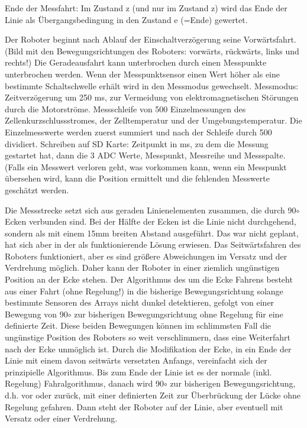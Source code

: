 \documentclass[a4paper,bibtotoc,oneside]{scrbook}
\begin{document}
Ende der Messfahrt: Im Zustand z (und nur im Zustand z) wird das Ende der Linie als Übergangsbedingung in den Zustand e (=Ende) gewertet. 





Der Roboter beginnt nach Ablauf der Einschaltverzögerung seine Vorwärtsfahrt. (Bild mit den Bewegungsrichtungen des Roboters: vorwärts, rückwärts, links und rechts!)
Die Geradeausfahrt kann unterbrochen durch einen Messpunkte unterbrochen werden. Wenn der Messpunktsensor einen Wert höher als eine bestimmte Schaltschwelle erhält wird in den Messmodus gewechselt.
Messmodus: Zeitverzögerung um 250 ms, zur Vermeidung von elektromagnetischen Störungen durch die Motorströme. Messschleife von 500 Einzelmessungen des Zellenkurzschlussstromes, der Zelltemperatur und der Umgebungstemperatur. Die Einzelmesswerte werden zuerst summiert und nach der Schleife durch 500 dividiert. 
Schreiben auf SD Karte: Zeitpunkt in ms, zu dem die Messung gestartet hat, dann die 3 ADC Werte, Messpunkt, Messreihe und Messspalte. (Falls ein Messwert verloren geht, was vorkommen kann, wenn ein Messpunkt übersehen wird, kann die Position ermittelt und die fehlenden Messwerte geschätzt werden.

Die Messstrecke setzt sich aus geraden Linienelementen zusammen, die durch 90$\circ$ Ecken verbunden sind. Bei der Hälfte der Ecken ist die Linie nicht durchgehend, sondern als mit einem 15mm breiten Abstand ausgeführt. Das war nicht geplant, hat sich aber in der als funktionierende Lösung erwiesen. Das Seitwärtsfahren des Roboters funktioniert, aber es sind größere Abweichungen im Versatz und der Verdrehung möglich. Daher kann der Roboter in einer ziemlich ungünstigen Position an der Ecke stehen. Der Algorithmus des um die Ecke Fahrens besteht aus einer Fahrt (ohne Regelung!) in die bisherige Bewegungsrichtung solange bestimmte Sensoren des Arrays nicht dunkel detektieren, gefolgt von einer Bewegung von 90$\circ$ zur bisherigen Bewegungsrichtung ohne Regelung für eine definierte Zeit. Diese beiden Bewegungen können im schlimmsten Fall die ungünstige Position des Roboters so weit verschlimmern, dass eine Weiterfahrt nach der Ecke unmöglich ist.
Durch die Modifikation der Ecke, in ein Ende der Linie mit einem davon seitwärts versetzten Anfangs, vereinfacht sich der prinzipielle Algorithmus. Bis zum Ende der Linie ist es der normale (inkl. Regelung) Fahralgorithmus, danach wird 90$\circ$ zur bisherigen Bewegungsrichtung, d.h. vor oder zurück, mit einer definierten Zeit zur Überbrückung der Lücke ohne Regelung gefahren. Dann steht der Roboter auf der Linie, aber eventuell mit Versatz oder einer Verdrehung.
\end{document}
